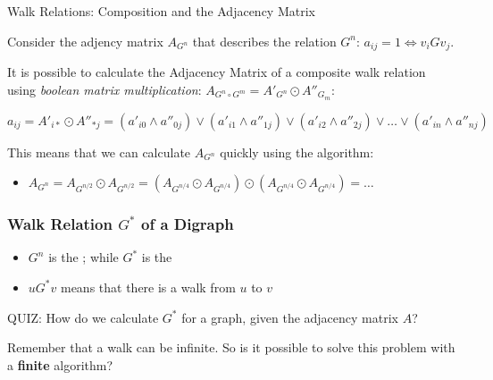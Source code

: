 \begin{frame}{Walk Relations: Composition and the Adjacency Matrix}

  Consider the adjency matrix $A_{G^n}$ that describes the relation $G^n$: $a_{ij} = 1 \iff v_i G v_j$.\bigskip

  It is possible to calculate the Adjacency Matrix of a composite walk relation using \emph{boolean matrix multiplication}: $A_{G^n\circ G^m} = A'_{G^n} \odot A''_{G_m}$:

  \begin{equation}
    a_{ij} = A'_{i*} \odot A''_{*j} = (a'_{i0} \land a''_{0j}) \lor (a'_{i1} \land a''_{1j}) \lor (a'_{i2} \land a''_{2j}) \lor \ldots \lor (a'_{in} \land a''_{nj})
  \end{equation}\bigskip

  This means that we can calculate $A_{G^n}$ quickly using the  algorithm:

  \begin{itemize}
    \item $A_{G^n} = A_{G^{n/2}} \odot A_{G^{n/2}} = (A_{G^{n/4}} \odot A_{G^{n/4}}) \odot (A_{G^{n/4}} \odot A_{G^{n/4}}) = \ldots$
  \end{itemize}

\end{frame}

\begin{frame}
  \frametitle{Walk Relation $G^*$ of a Digraph}

  \begin{itemize}
  \item $G^n$ is the ; while $G^*$ is the 
  \item $u G^* v$ means that there is a walk from $u$ to $v$ \\
  \end{itemize}\bigskip

  \alert{QUIZ:} How do we calculate $G^*$ for a graph, given the adjacency matrix $A$?\bigskip

  Remember that a walk can be infinite. So is it possible to solve this problem with a {\bf finite} algorithm?
\end{frame}

